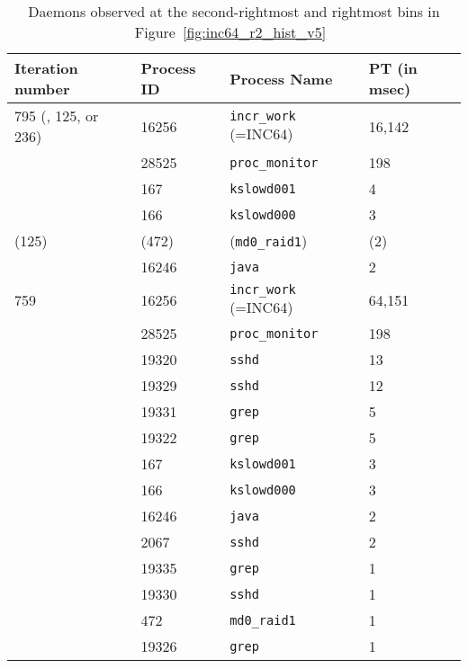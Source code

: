 \begin{table}[h]
\begin{center}
\begin{tabular}{|l|l|l|l|} \hline
Iteration number &  Process ID & Process Name  & PT (in msec)\\ \hline
795 (, 125, or 236) & 16256 & {\tt incr\_work} (=INC64) & 16,142 \\ \hline
	& 28525 & {\tt proc\_monitor} & 198 \\ \hline
	& 167 & {\tt kslowd001} &  4 \\ \hline
	& 166 & {\tt kslowd000} &  3 \\ \hline 
(125) & (472) & ({\tt md0\_raid1}) & (2) \\ \hline
    & 16246 & {\tt java} &  2 \\ \hline 
\hline 
759 & 16256 & {\tt incr\_work} (=INC64) & 64,151 \\ \hline
& 28525 & {\tt proc\_monitor} & 198 \\ \hline
& 19320 & {\tt sshd} & 13 \\ \hline
& 19329 & {\tt sshd}  & 12 \\ \hline
& 19331 & {\tt grep}  &  5 \\ \hline
& 19322 & {\tt grep}  &  5 \\ \hline
& 167 & {\tt kslowd001} & 3\\ \hline
& 166 & {\tt kslowd000} &  3 \\ \hline
& 16246 & {\tt java} &  2 \\ \hline
& 2067 & {\tt sshd}  &  2 \\ \hline
& 19335 & {\tt grep}  &  1 \\ \hline
& 19330 & {\tt sshd}  &  1 \\ \hline
& 472 & {\tt md0\_raid1} &  1 \\ \hline
& 19326 & {\tt grep}  &  1 \\ \hline
\hline
\end{tabular}
\end{center}
\caption{Daemons observed at the second-rightmost and rightmost bins in Figure~\ref{fig:inc64_r2_hist_v5}~\label{tab:inc64_daemons}}
\end{table}

\clearpage
\newpage

